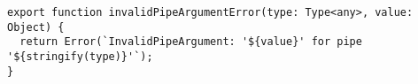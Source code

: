 \begin{verbatim}
export function invalidPipeArgumentError(type: Type<any>, value: Object) {
  return Error(`InvalidPipeArgument: '${value}' for pipe '${stringify(type)}'`);
}
\end{verbatim}
